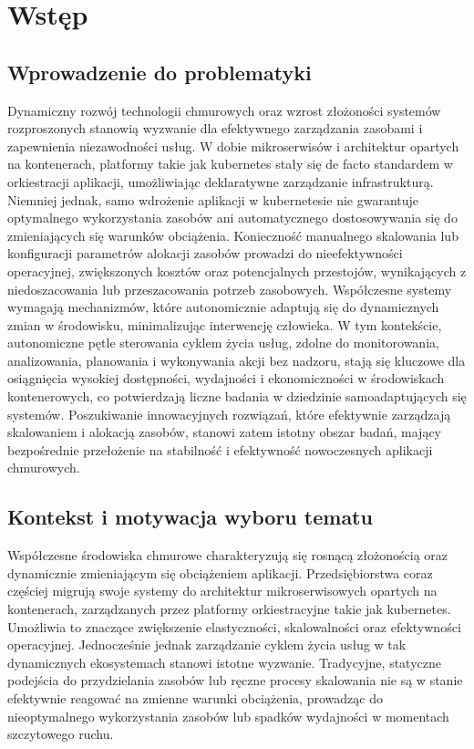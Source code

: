 \newpage %

\section{Wstęp}


\subsection{Wprowadzenie do problematyki}

Dynamiczny rozwój technologii chmurowych oraz wzrost złożoności systemów rozproszonych stanowią wyzwanie dla efektywnego zarządzania zasobami i zapewnienia niezawodności usług. W dobie mikroserwisów i architektur opartych na kontenerach, platformy takie jak \Gls{kubernetes} stały się de facto standardem w orkiestracji aplikacji, umożliwiając deklaratywne zarządzanie infrastrukturą. Niemniej jednak, samo wdrożenie aplikacji w \Gls{kubernetes}ie nie gwarantuje optymalnego wykorzystania zasobów ani automatycznego dostosowywania się do zmieniających się warunków obciążenia. Konieczność manualnego skalowania lub konfiguracji parametrów alokacji zasobów prowadzi do nieefektywności operacyjnej, zwiększonych kosztów oraz potencjalnych przestojów, wynikających z niedoszacowania lub przeszacowania potrzeb zasobowych. Współczesne systemy wymagają mechanizmów, które autonomicznie adaptują się do dynamicznych zmian w środowisku, minimalizując interwencję człowieka. W tym kontekście, autonomiczne pętle sterowania cyklem życia usług, zdolne do monitorowania, analizowania, planowania i wykonywania akcji bez nadzoru, stają się kluczowe dla osiągnięcia wysokiej dostępności, wydajności i ekonomiczności w środowiskach kontenerowych, co potwierdzają liczne badania w dziedzinie samoadaptujących się systemów. Poszukiwanie innowacyjnych rozwiązań, które efektywnie zarządzają skalowaniem i alokacją zasobów, stanowi zatem istotny obszar badań, mający bezpośrednie przełożenie na stabilność i efektywność nowoczesnych aplikacji chmurowych.

\subsection{Kontekst i motywacja wyboru tematu}

Współczesne środowiska chmurowe charakteryzują się rosnącą złożonością oraz dynamicznie zmieniającym się obciążeniem aplikacji. Przedsiębiorstwa coraz częściej migrują swoje systemy do architektur mikroserwisowych opartych na kontenerach, zarządzanych przez platformy orkiestracyjne takie jak \Gls{kubernetes}. Umożliwia to znaczące zwiększenie elastyczności, skalowalności oraz efektywności operacyjnej. Jednocześnie jednak zarządzanie cyklem życia usług w tak dynamicznych ekosystemach stanowi istotne wyzwanie. Tradycyjne, statyczne podejścia do przydzielania zasobów lub ręczne procesy skalowania nie są w stanie efektywnie reagować na zmienne warunki obciążenia, prowadząc do nieoptymalnego wykorzystania zasobów lub spadków wydajności w momentach szczytowego ruchu.

